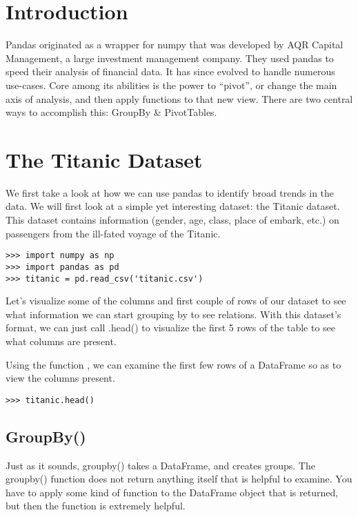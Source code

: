 \label{lab:pandas3}

\section*{Introduction}
Pandas originated as a wrapper for numpy that was developed by AQR Capital Management, a large investment management company. They used pandas to speed their analysis of financial data. It has since evolved to handle numerous use-cases. Core among its abilities is the power to ``pivot'', or change the main axis of analysis, and then apply functions to that new view. There are two central ways to accomplish this: GroupBy & PivotTables.

\section*{The Titanic Dataset}
We first take a look at how we can use pandas to identify broad trends in the data. We will first look at a simple yet interesting dataset: the Titanic dataset. This dataset contains information (gender, age, class, place of embark, etc.) on passengers from the ill-fated voyage of the Titanic.

\begin{lstlisting}
>>> import numpy as np
>>> import pandas as pd
>>> titanic = pd.read_csv('titanic.csv')
\end{lstlisting}

Let's visualize some of the columns and first couple of rows of our dataset to see what information we can start grouping by to see relations. With this dataset's format, we can just call .head() to visualize the first 5 rows of the table to see what columns are present.

Using the function , we can examine the first few rows of a DataFrame so as to view the columns present.

\begin{lstlisting}
>>> titanic.head()
\end{lstlisting}


\subsection*{GroupBy()}
Just as it sounds, groupby() takes a DataFrame, and creates groups. The groupby() function does not return anything itself that is helpful to examine. You have to apply some kind of function to the DataFrame object that is returned, but then the function is extremely helpful.

